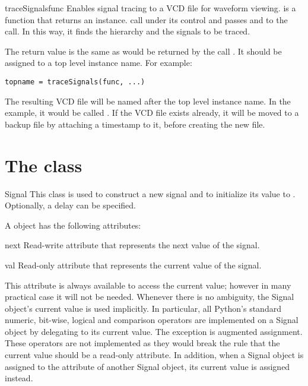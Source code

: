 \begin{funcdesc}{traceSignals}{func  }
Enables signal tracing to a VCD file for waveform viewing.
 is a function that returns an instance.
 call  under its control
and passes  and  to the call. In this way, it
finds the hierarchy and the signals to be traced.

The return value is the same as would be returned by the call
. It should be assigned
to a top level instance name. For example:
\begin{verbatim}
topname = traceSignals(func, ...)
\end{verbatim}
The resulting VCD file will be named after the top level instance
name. In the example, it would be called .  If the
VCD file exists already, it will be moved to a backup file by
attaching a timestamp to it, before creating the new file.
\end{funcdesc}


\section{The  class \label{ref-sig}}

\begin{classdesc}{Signal}{ }
This class is used to construct a new signal and to initialize its
value to . Optionally, a delay can be specified.
\end{classdesc}

A  object has the following attributes:

\begin{memberdesc}[Signal]{next}
Read-write attribute that represents the next value of the signal.
\end{memberdesc}

\begin{memberdesc}[Signal]{val}
Read-only attribute that represents the current value of the signal.

This attribute is always available to access the current value;
however in many practical case it will not be needed. Whenever there
is no ambiguity, the Signal object's current value is used
implicitly. In particular, all Python's standard numeric, bit-wise,
logical and comparison operators are implemented on a Signal object by
delegating to its current value. The exception is augmented
assignment. These operators are not implemented as they would break
the rule that the current value should be a read-only attribute. In
addition, when a Signal object is assigned to the 
attribute of another Signal object, its current value is assigned
instead.
\end{memberdesc}

